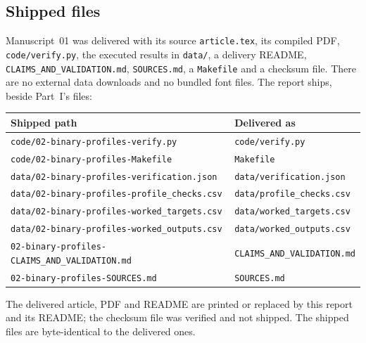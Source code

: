 \documentclass[11pt,letterpaper]{article}
\theoremstyle{definition}\newtheorem{definition}[theorem]{Definition}
\theoremstyle{remark}\newtheorem{remark}[theorem]{Remark}
\theoremstyle{definition}\newtheorem{question}[theorem]{Question}
\begin{document}
\subsection{Shipped files}
Manuscript~01 was delivered with its source \texttt{article.tex}, its compiled
PDF, \texttt{code/verify.py}, the executed results in \texttt{data/}, a
delivery README, \texttt{CLAIMS\_AND\_VALIDATION.md}, \texttt{SOURCES.md}, a
\texttt{Makefile} and a checksum file. There are no external data downloads
and no bundled font files. The report ships, beside Part~I's files:
\begin{center}
\small
\begin{tabular}{@{}>{\raggedright}p{}>{\raggedright\arraybackslash}p{}@{}}
\toprule
Shipped path & Delivered as\\
\midrule
\nolinkurl{code/02-binary-profiles-verify.py} & \texttt{code/verify.py}\\
\nolinkurl{code/02-binary-profiles-Makefile} & \texttt{Makefile}\\
\nolinkurl{data/02-binary-profiles-verification.json} & \texttt{data/verification.json}\\
\nolinkurl{data/02-binary-profiles-profile_checks.csv} & \texttt{data/profile\_checks.csv}\\
\nolinkurl{data/02-binary-profiles-worked_targets.csv} & \texttt{data/worked\_targets.csv}\\
\nolinkurl{data/02-binary-profiles-worked_outputs.csv} & \texttt{data/worked\_outputs.csv}\\
\nolinkurl{02-binary-profiles-CLAIMS_AND_VALIDATION.md} & \texttt{CLAIMS\_AND\_VALIDATION.md}\\
\nolinkurl{02-binary-profiles-SOURCES.md} & \texttt{SOURCES.md}\\
\bottomrule
\end{tabular}
\end{center}
The delivered article, PDF and README are printed or replaced by this report
and its README; the checksum file was verified and not shipped. The shipped
files are byte-identical to the delivered ones.
\end{document}
